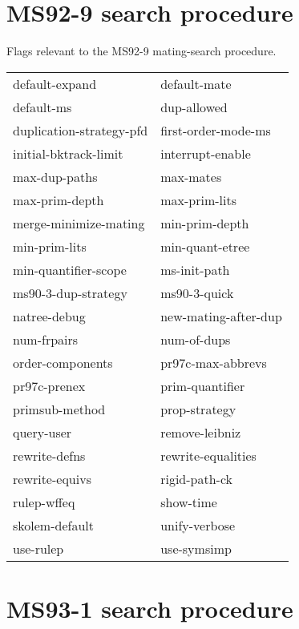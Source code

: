 \section{MS92-9 search procedure}

\begin{description} 
\item[MS92-9]  
Flags relevant to the MS92-9 mating-search procedure.

\begin{tabular}{l l}
default-expand&default-mate\\
default-ms&dup-allowed\\
duplication-strategy-pfd&first-order-mode-ms\\
initial-bktrack-limit&interrupt-enable\\
max-dup-paths&max-mates\\
max-prim-depth&max-prim-lits\\
merge-minimize-mating&min-prim-depth\\
min-prim-lits&min-quant-etree\\
min-quantifier-scope&ms-init-path\\
ms90-3-dup-strategy&ms90-3-quick\\
natree-debug&new-mating-after-dup\\
num-frpairs&num-of-dups\\
order-components&pr97c-max-abbrevs\\
pr97c-prenex&prim-quantifier\\
primsub-method&prop-strategy\\
query-user&remove-leibniz\\
rewrite-defns&rewrite-equalities\\
rewrite-equivs&rigid-path-ck\\
rulep-wffeq&show-time\\
skolem-default&unify-verbose\\
use-rulep&use-symsimp\\
\end{tabular}
\item
\end{description}

\section{MS93-1 search procedure}

